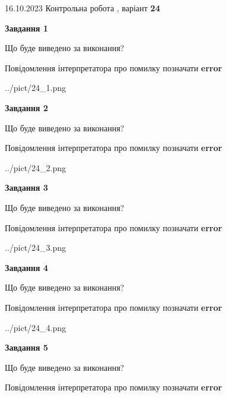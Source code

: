\documentclass[12pt, ukrainian]{article}
\begin{document}
{\Large{16.10.2023 Контрольна робота , варіант  \No \textbf { 24 }\par}}
{
\begin {large}
{\begin {center}\textbf{Завдання 1}\end {center}}\par
Що буде виведено за виконання? \par
Повідомлення інтерпретатора про помилку позначати \textbf{error}

\begin{center}
	{../pict/24_1.png}
\end{center}
\newpage

{\begin {center}\textbf{Завдання 2}\end {center}}\par
Що буде виведено за виконання? \par
Повідомлення інтерпретатора про помилку позначати \textbf{error}

\begin{center}
	{../pict/24_2.png}
\end{center}
\newpage

{\begin {center}\textbf{Завдання 3}\end {center}}\par
Що буде виведено за виконання? \par
Повідомлення інтерпретатора про помилку позначати \textbf{error}

\begin{center}
	{../pict/24_3.png}
\end{center}
\newpage

{\begin {center}\textbf{Завдання 4}\end {center}}\par
Що буде виведено за виконання? \par
Повідомлення інтерпретатора про помилку позначати \textbf{error}

\begin{center}
	{../pict/24_4.png}
\end{center}
\newpage

{\begin {center}\textbf{Завдання 5}\end {center}}\par
Що буде виведено за виконання? \par
Повідомлення інтерпретатора про помилку позначати \textbf{error}


\end{large}}
\end{document}
